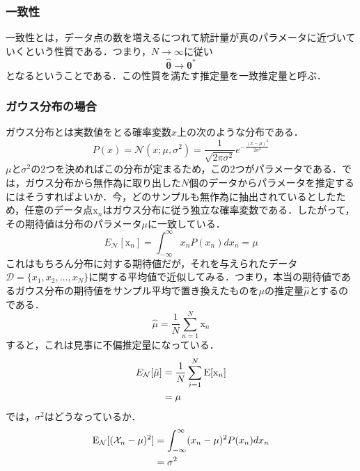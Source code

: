 \documentclass[a4paper,11pt]{jsreport}
\begin{document}
\subsubsection*{一致性}
一致性とは，データ点の数を増えるにつれて統計量が真のパラメータに近づいていくという性質である．つまり，$N \rightarrow \infty$に従い
\begin{equation}
  \hat{\bm{\theta}}
  \rightarrow \bm{\theta}^*
\end{equation}
となるということである．この性質を満たす推定量を一致推定量と呼ぶ．

\subsubsection{ガウス分布の場合}
ガウス分布とは実数値をとる確率変数$x$上の次のような分布である．
\begin{equation}
  P(x)
  = \mathcal{N}(x; \mu, \sigma^2)
  = \frac{1}{\sqrt{2 \pi \sigma^2}} e^{-\frac{(x-\mu)^2}{2\sigma^2}}
\end{equation}
$\mu$と$\sigma^2$の2つを決めればこの分布が定まるため，この2つがパラメータである．では，ガウス分布から無作為に取り出した$N$個のデータからパラメータを推定するにはそうすればよいか．今，どのサンプルも無作為に抽出されているとしたため，任意のデータ点$\mathrm{x}_n$はガウス分布に従う独立な確率変数である．したがって，その期待値は分布のパラメータ$\mu$に一致している．
\begin{equation}
  E_{\mathcal{N}}[\mathrm{x}_n]
  = \int_{-\infty}^{\infty} x_n P(x_n) dx_n
  = \mu
\end{equation}
これはもちろん分布に対する期待値だが，それを与えられたデータ$\mathcal{D} = \{ x_1, x_2, \dots, x_N \}$に関する平均値で近似してみる．つまり，本当の期待値であるガウス分布の期待値をサンプル平均で置き換えたものを$\mu$の推定量$\hat{\mu}$とするのである．
\begin{equation}
  \hat{\mu}
  = \frac{1}{N} \sum_{n=1}^{N} \mathrm{x}_n
\end{equation}
すると，これは見事に不偏推定量になっている．
\begin{align}
  E_{\mathcal{N}}[\hat{\mu}]
   & = \frac{1}{N} \sum_{i=1}^N \mathrm{E}[\mathrm{x}_n] \notag \\
   & = \mu
\end{align}
では，$\sigma^2$はどうなっているか．
\begin{align}
  \mathrm{E}_{\mathcal{N}}[(\mathcal{X}_n - \mu)^2]
   & = \int_{-\infty}^{\infty} (x_n - \mu)^2 P(x_n) dx_n \notag \\
   & = \sigma^2
\end{align}
\end{document}
